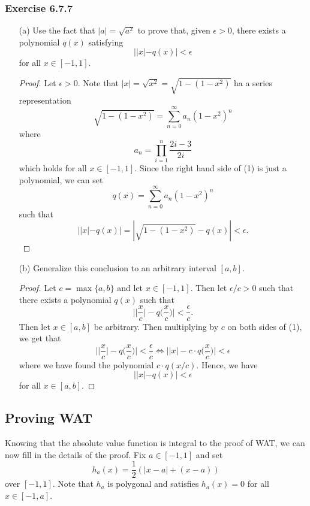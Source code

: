 \subsubsection{Exercise 6.7.7} 
\begin{enumerate}
    \item[(a)] Use the fact that \( | a  |  = \sqrt{ a^{2} }  \) to prove that, given \( \epsilon > 0  \), there exists a polynomial \( q(x)  \) satisfying 
        \[  | | x  | - q(x)  | < \epsilon \]
        for all \( x \in [-1,1] \).
        \begin{proof}
            Let \( \epsilon > 0   \). Note that \( | x  |  = \sqrt{ x^{2}  }  = \sqrt{ 1 - (1 - x^2)  }  \) ha a series representation 
            \[  \sqrt{ 1 - (1-x^2) } = \sum_{ n=0  }^{ \infty  } a_n (1 -x^2)^n \tag{1} \] where 
            \[  a_n =  \prod_{i=1}^{n} \frac{ 2i - 3  }{ 2i } \]which holds for all \( x \in [-1,1] \). Since the right hand side of (1) is just a polynomial, we can set 
            \[  q(x) = \sum_{ n=0 }^{ \infty  } a_n (1-x^{2})^{n} \] such that 
            \[  | | x  | - q(x)   | = | \sqrt{ 1 - (1-x^2) } - q(x) | < \epsilon.  \]
        \end{proof}

    \item[(b)] Generalize this conclusion to an arbitrary interval \( [a,b] \).
        \begin{proof}
			Let \( c = \max \{ a, b  \}  \) and let \( x \in [-1,1] \). Then let \( \epsilon / c > 0    \) such that there exists a polynomial \( q(x)  \) such that
			\[ \Big| \Big| \frac{ x }{ c }  \Big| - q \Big( \frac{ x }{ c }  \Big) \Big| < \frac{ \epsilon  }{ c  } \tag{1}. \]
		Then let \( x \in [a,b]  \) be arbitrary. Then multiplying by \( c  \) on both sides of (1), we get that
		\[ \Big| \Big| \frac{ x }{ c } \Big| - q \Big( \frac{ x }{ c }  \Big) \Big| < \frac{ \epsilon  }{ c  }  \iff  \Big| | x | - c \cdot q \Big( \frac{ x }{ c } \Big) \Big| < \epsilon   \]
		where we have found the polynomial \( c \cdot q (x/c) \). Hence, we have 
		\[  | | x | - q(x)  | < \epsilon  \]
		for all \( x \in [a,b] \).
        \end{proof}
\end{enumerate}



\subsection{Proving WAT} 

Knowing that the absolute value function is integral to the proof of WAT, we can now fill in the details of the proof. Fix \( a \in [-1,1]  \) and set 
\[  h_{a}(x) = \frac{ 1 }{ 2 }  ( | x -a  | + (x-a)) \] over \( [-1,1]  \). Note that \( h_{a}  \) is polygonal and satisfies \( h_{a}(x) = 0  \) for all \( x \in [-1,a] \).

